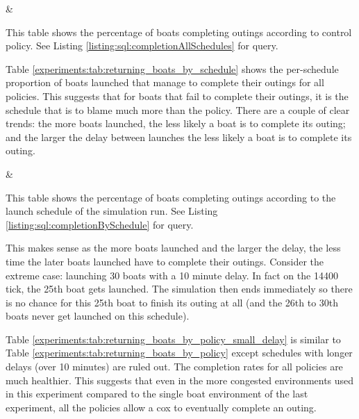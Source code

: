   \begin{table}[h]
  \centering
  {\cp & \landed}
  \caption{This table shows the percentage of boats completing outings according to control policy. See Listing \ref{listing:sql:completionAllSchedules} for query.}
  \label{experiments:tab:returning_boats_by_policy}
  \end{table}
  
  Table \ref{experiments:tab:returning_boats_by_schedule} shows the per-schedule proportion of boats launched that manage to complete their outings for all policies. This suggests that for boats that fail to complete their outings, it is the schedule that is to blame much more than the policy. There are a couple of clear trends: the more boats launched, the less likely a boat is to complete its outing; and the larger the delay between launches the less likely a boat is to complete its outing.

  \begin{table}[h]
  \centering
  {\name & \landed}
  \caption{This table shows the percentage of boats completing outings according to the launch schedule of the simulation run. See Listing \ref{listing:sql:completionBySchedule} for query.}
  \label{experiments:tab:returning_boats_by_schedule}
  \end{table}
  
  This makes sense as the more boats launched and the larger the delay, the less time the later boats launched have to complete their outings. Consider the extreme case: launching 30 boats with a 10 minute delay. In fact on the 14400 tick, the 25th boat gets launched. The simulation then ends immediately so there is no chance for this 25th boat to finish its outing at all (and the 26th to 30th boats never get launched on this schedule). 
  
  Table \ref{experiments:tab:returning_boats_by_policy_small_delay} is similar to Table \ref{experiments:tab:returning_boats_by_policy} except schedules with longer delays (over 10 minutes) are ruled out. The completion rates for all policies are much healthier. This suggests that even in the more congested environments used in this experiment compared to the single boat environment of the last experiment, all the policies allow a cox to eventually complete an outing. 
  
